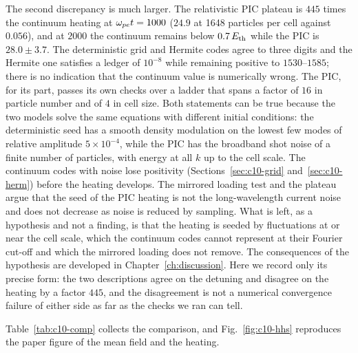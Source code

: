 The second discrepancy is much larger. The relativistic PIC plateau is $445$ times the continuum heating at $\omega_{pe} t=1000$ ($24.9$ at 1648 particles per cell against $0.056$), and at $2000$ the continuum remains below $0.7\,E_{\rm th}$ while the PIC is $28.0\pm3.7$. The deterministic grid and Hermite codes agree to three digits and the Hermite one satisfies a ledger of $10^{-8}$ while remaining positive to $1530$--$1585$; there is no indication that the continuum value is numerically wrong. The PIC, for its part, passes its own checks over a ladder that spans a factor of $16$ in particle number and of $4$ in cell size. Both statements can be true because the two models solve the same equations with different initial conditions: the deterministic seed has a smooth density modulation on the lowest few modes of relative amplitude $5\times10^{-4}$, while the PIC has the broadband shot noise of a finite number of particles, with energy at all $k$ up to the cell scale. The continuum codes with noise lose positivity (Sections~\ref{sec:c10-grid} and~\ref{sec:c10-herm}) before the heating develops. The mirrored loading test and the plateau argue that the seed of the PIC heating is not the long-wavelength current noise and does not decrease as noise is reduced by sampling. What is left, as a hypothesis and not a finding, is that the heating is seeded by fluctuations at or near the cell scale, which the continuum codes cannot represent at their Fourier cut-off and which the mirrored loading does not remove. The consequences of the hypothesis are developed in Chapter~\ref{ch:discussion}. Here we record only its precise form: the two descriptions agree on the detuning and disagree on the heating by a factor $445$, and the disagreement is not a numerical convergence failure of either side as far as the checks we ran can tell.

Table~\ref{tab:c10-comp} collects the comparison, and Fig.~\ref{fig:c10-hhs} reproduces the paper figure of the mean field and the heating.

